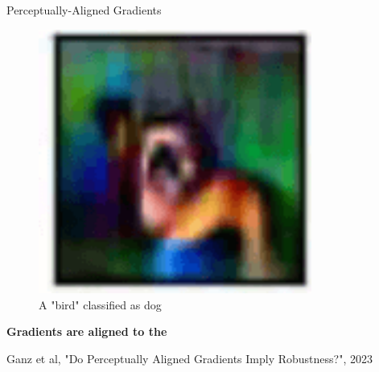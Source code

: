 \begin{frame}{Perceptually-Aligned Gradients}
\begin{figure}
\begin{minipage}{0.25\textwidth}
            \centering
            \includegraphics[width=0.8\textwidth]{assets/pag_attack_dog.png}
            \caption{A "bird" classified as dog}
        \end{minipage}
    \end{figure}

    \vfill
    \centering
    \textbf{Gradients are aligned to the} 

    \vspace{0.3cm}
    \footnotesize
    \centering
    Ganz et al, "Do Perceptually Aligned Gradients Imply Robustness?", 2023
\end{frame}





